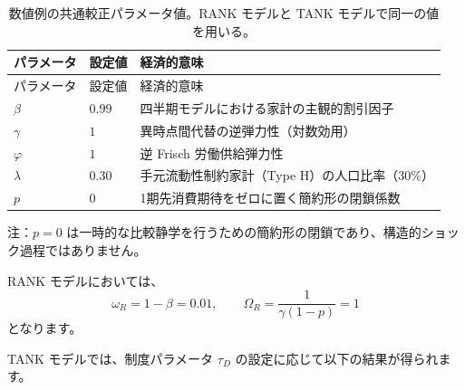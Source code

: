 \documentclass[
  japanese,
  lualatex,
  ja=standard,
  12pt,
  a4paper]{ltjsarticle}
\begin{document}
\begin{longtable}[]{@{}
  >{\raggedright\arraybackslash}p{}
  >{\raggedleft\arraybackslash}p{}
  >{\raggedright\arraybackslash}p{}@{}}
\caption{数値例の共通較正パラメータ値。RANK モデルと TANK
モデルで同一の値を用いる。}\label{tbl-lecture12-calibration}\tabularnewline
\toprule\noalign{}
\begin{minipage}[b]{\linewidth}\raggedright
パラメータ
\end{minipage} & \begin{minipage}[b]{\linewidth}\raggedleft
設定値
\end{minipage} & \begin{minipage}[b]{\linewidth}\raggedright
経済的意味
\end{minipage} \\
\midrule\noalign{}
\endfirsthead
\toprule\noalign{}
\begin{minipage}[b]{\linewidth}\raggedright
パラメータ
\end{minipage} & \begin{minipage}[b]{\linewidth}\raggedleft
設定値
\end{minipage} & \begin{minipage}[b]{\linewidth}\raggedright
経済的意味
\end{minipage} \\
\midrule\noalign{}
\endhead
\bottomrule\noalign{}
\endlastfoot
\(\beta\) & \(0.99\) & 四半期モデルにおける家計の主観的割引因子 \\
\(\gamma\) & \(1\) & 異時点間代替の逆弾力性（対数効用） \\
\(\varphi\) & \(1\) & 逆 Frisch 労働供給弾力性 \\
\(\lambda\) & \(0.30\) & 手元流動性制約家計（Type
H）の人口比率（30\%） \\
\(p\) & \(0\) & 1期先消費期待をゼロに置く簡約形の閉鎖係数 \\
\end{longtable}

注：\(p=0\)
は一時的な比較静学を行うための簡約形の閉鎖であり、構造的ショック過程ではありません。

RANK モデルにおいては、 \[
\omega_R = 1 - \beta = 0.01,
\qquad
\Omega_R = \frac{1}{\gamma(1-p)} = 1
\] となります。

TANK モデルでは、制度パラメータ \(\tau_D\)
の設定に応じて以下の結果が得られます。
\end{document}
